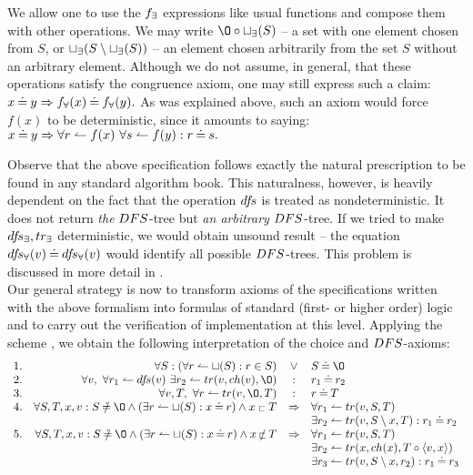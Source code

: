 \noindent We allow one to use the $f_\exists$ expressions like usual functions and
compose them with other operations. We may write $\es\ap \Bree \ch(S)$ -- a set with one element chosen from $S$, or $\sqcup_\exists(S\setminus \sqcup_\exists(S))$ -- an element chosen arbitrarily from the set $S$ without an arbitrary element. Although we do not assume, in general, that these operations satisfy the congruence axiom, one may still express such a claim: $x\mathbin{\doteq} y\mathrel\Rightarrow f_\forall(x)\mathbin{\doteq}f_\forall(y).$ As was explained above, such an axiom would force $f(x)$ to be deterministic, since it
amounts to saying: $x\mathbin{\doteq} y\mathrel\Rightarrow \forall r\leftharpoonup f(x)\ \forall s\leftharpoonup f(y): r\mathbin{\doteq} s.$

Observe that the above specification follows exactly the natural prescription to be found in any standard algorithm book. This naturalness, however, is heavily dependent on the fact that the operation $df\!s$ is treated as nondeterministic. It does not return {\em the} $DFS$-tree but {\em an arbitrary} $DFS$-tree. If we tried to make $df\!s_\exists,tr_\exists$ deterministic, we would obtain unsound result -- the equation $df\!s_\forall(v)\mathbin{\doteq} df\!s_\forall(v)$ 
would identify
all possible $DFS$-trees. This problem is discussed in more detail in \cite{adt}. \\[2ex]
Our general strategy is now to transform axioms of the specifications written with the above formalism into
formulas of standard (first- or higher order) logic and to carry out the verification of
implementation at this level.
Applying the scheme , we obtain the following interpretation of the choice and $DFS$-axioms:
\begin{equation}\label{eq:trans}
\begin{array}{rrcl}
1.& \forall S: (\forall r\isres \ch(S) : r \in S)& \lor& S\Eq\es\\ 2.& \forall v,\ \forall r_1\isres \dfs(v)\ \exists r_2\isres tr(v,ch(v),\es) & :
& r_1 \Eq r_2 \\
3.& \forall v,T,\ \forall r\isres tr(v,\es,T)& : & r\Eq T \\ 4.& \forall S,T,x,v: S\Not\Eq\es\land (\exists r\isres\ch(S):x\Eq r) 
\land x\lin T & \impl
& \forall r_1\isres tr(v,S,T)\\
& & &\exists r_2\isres tr(v,S\setminus x,T): r_1\Eq r_2 \\ 5.& \forall S,T,x,v : S\Not\Eq\es\land (\exists r\isres\ch(S):x\Eq r) 
\land x\Not\lin T & \impl
& \forall r_1\isres tr(v,S,T)\\
& & & \exists r_2\isres tr(x,ch(x),T\ap\<v,x\>)\\ & & & \exists r_3\isres tr(v,S\setminus x,r_2): r_1\Eq r_3 \end{array}
\end{equation}
